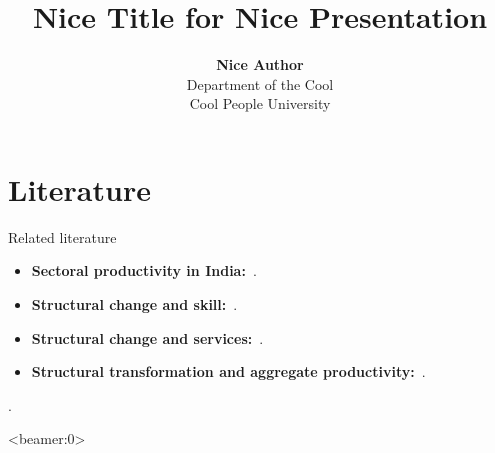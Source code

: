 \documentclass[10pt,xcolor={svgnames}]{beamer}
\begin{document}
\title[]{\textbf{Nice Title for Nice Presentation}}
\author[Nice Author]{\textbf{Nice Author} \\
Department of the Cool \\
Cool People University}
\date[]{}

\AtBeginSection[]{\frame{\sectionpage}}
\AtBeginSubsection[]{\frame{\subsectionpage}}

\begin{frame}
	\titlepage
\end{frame}

\section{Literature}

\begin{frame}{Related literature}
	\begin{itemize}
		\item \textbf{Sectoral productivity in India:}~\citep{rodrik2004hindugrowth,sivasubramonian2004humancapital,hsieh2009misallocation,broadberry2010historical,eichengreen2011servicegrowth,verma2012tfp,ziebarth2013misallocation,garciasantana2014reservationlaws}.
		\item \textbf{Structural change and skill:}~\citep{buera2018skillbiasedstructchange,herrendorf2018humancapital,herrendorf2019China,herrendorf2015endogenous}.
		\item \textbf{Structural change and services:}~\citep{buera2012service,duernecker2017structural,duarte2019pricesproductivity}.
		\item \textbf{Structural transformation and aggregate productivity:}~\citep{ngai2007structural,restuccia2008aggregateproductivity,duarte2010aggregateproductivity,rodrik2016premature,mcmillanrodrik2014africa}.
	\end{itemize}
\end{frame}

\begin{frame}
\citet{turnovsky2016population}. \cite{arnold2016servicesreform}
\end{frame}

\begin{frame}<beamer:0>


\end{frame}
\end{document}
